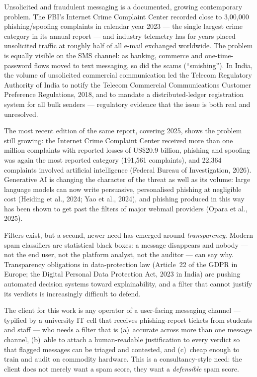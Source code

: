 \documentclass[12pt,a4paper]{report}
\begin{document}
Unsolicited and fraudulent messaging is a documented, growing contemporary
problem. The FBI's Internet Crime Complaint Center recorded close to
3,00,000 phishing/spoofing complaints in calendar year 2023 --- the single
largest crime category in its annual report --- and industry telemetry has for
years placed unsolicited traffic at roughly half of all e-mail exchanged
worldwide. The problem is equally visible on the SMS channel: as banking,
commerce and one-time-password flows moved to text messaging, so did the
scams (``smishing''). In India, the volume of unsolicited commercial
communication led the Telecom Regulatory Authority of India to notify the
Telecom Commercial Communications Customer Preference Regulations, 2018, and
to mandate a distributed-ledger registration system for all bulk senders ---
regulatory evidence that the issue is both real and unresolved.

The most recent edition of the same report, covering 2025, shows the problem
still growing: the Internet Crime Complaint Center received more than one
million complaints with reported losses of US\$20.9 billion, phishing and
spoofing was again the most reported category (191,561 complaints), and
22,364 complaints involved artificial intelligence (Federal Bureau of
Investigation, 2026). Generative AI is changing the character of the threat as
well as its volume: large language models can now write persuasive,
personalised phishing at negligible cost (Heiding et al., 2024; Yao et al.,
2024), and phishing produced in this way has been shown to get past the filters
of major webmail providers (Opara et al., 2025).

Filters exist, but a second, newer need has emerged around \emph{transparency}.
Modern spam classifiers are statistical black boxes: a message disappears and
nobody --- not the end user, not the platform analyst, not the auditor --- can
say why. Transparency obligations in data-protection law (Article~22 of the
GDPR in Europe; the Digital Personal Data Protection Act, 2023 in India) are
pushing automated decision systems toward explainability, and a filter that
cannot justify its verdicts is increasingly difficult to defend.

The client for this work is any operator of a user-facing messaging channel
--- typified by a university IT cell that receives phishing-report tickets
from students and staff --- who needs a filter that is (a)~accurate across
more than one message channel, (b)~able to attach a human-readable
justification to every verdict so that flagged messages can be triaged and
contested, and (c)~cheap enough to train and audit on commodity hardware.
This is a consultancy-style need: the client does not merely want a spam
score, they want a \emph{defensible} spam score.
\end{document}
